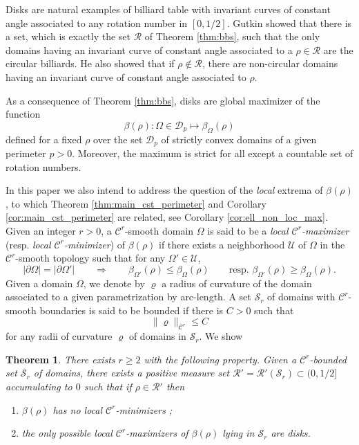 \documentclass[a4paper]{article}
\newtheorem{theorem}{Theorem}
\theoremstyle{definition}
\begin{document}
Disks are natural examples of billiard table with invariant curves of constant angle associated to any rotation number in $[0,1/2]$. Gutkin \cite[Corollary 2]{Gutkin} showed that there is a set, which is exactly the set $\mathscr R$ of Theorem \ref{thm:bbs}, such that the only domains having an invariant curve of constant angle associated to a $\rho\in\mathscr R$ are the circular billiards. He also showed that if $\rho\notin\mathscr R$, there are non-circular domains having an invariant curve of constant angle associated to $\rho$.

As a consequence of Theorem \ref{thm:bbs}, disks are global maximizer of the function 
\begin{equation}
\label{equ:beta_rho}
\beta(\rho):\Omega\in\mathscr D_p\mapsto\beta_{\Omega}(\rho)
\end{equation}
defined for a fixed $\rho$ over the set $\mathscr D_p$ of strictly convex domains of a given perimeter $p>0$. Moreover, the maximum is strict for all except a countable set of rotation numbers.

In this paper we also intend to address the question of the \textit{local} extrema of $\beta(\rho)$, to which Theorem \ref{thm:main_cst_perimeter} and Corollary \ref{cor:main_cst_perimeter} are related, see Corollary \ref{cor:ell_non_loc_max}. Given an integer $r>0$, a $\mathscr C^r$-smooth domain $\Omega$ is said to be a \textit{local $\mathscr C^r$-maximizer} (resp. \textit{local $\mathscr C^r$-minimizer}) of $\beta(\rho)$ if there exists a neighborhood $\mathcal U$ of $\Omega$ in the $\mathscr C^r$-smooth topology such that for any $\Omega'\in\mathcal U$,
    \[
    |\partial\Omega|=|\partial\Omega'|
    \qquad\Longrightarrow\qquad
    \beta_{\Omega'}(\rho) \leq \beta_{\Omega}(\rho)
    \qquad \text{resp. }
    \beta_{\Omega'}(\rho) \geq \beta_{\Omega}(\rho).
    \]
Given a domain $\Omega$, we denote by $\varrho$ a radius of curvature of the domain associated to a given parametrization by arc-length. A set $\mathscr S_r$ of domains with $\mathscr C^r$-smooth boundaries is said to be bounded if there is $C>0$ such that 
\[
\|\varrho\|_{\mathscr C^r}\leq C
\]
for any radii of curvature $\varrho$ of domains in $\mathscr S_r$. We show

\begin{theorem}
\label{thm:main_local_max}
There exists $r\geq 2$ with the following property. Given a $\mathscr C^r$-bounded set $\mathscr S_r$ of domains, there exists a positive measure set $\mathscr R'=\mathscr R'(\mathscr S_r)\subset(0,1/2]$ accumulating to $0$ such that if $\rho\in\mathscr R'$ then 
\begin{enumerate}
    \item $\beta(\rho)$ has no local $\mathscr C^r$-minimizers ;
    \item the only possible local $\mathscr C^r$-maximizers of $\beta(\rho)$ lying in $\mathscr S_r$ are disks.
\end{enumerate} 
\end{theorem}
\end{document}
